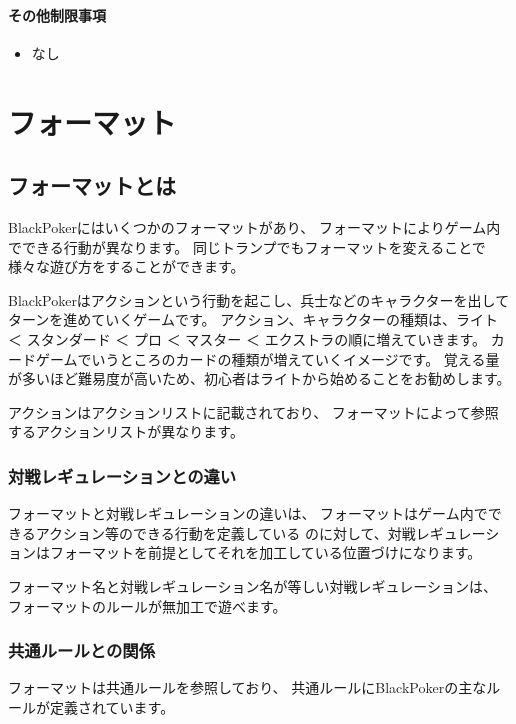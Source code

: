 \documentclass[letterpaper,10pt,dvipdfmx]{sphinxmanual}
\begin{document}
\subsubsection{その他制限事項}
\label{\detokenize{match-regulations/master40:id5}}\begin{itemize}
\item {} 
なし

\end{itemize}


\chapter{フォーマット}
\label{\detokenize{format/format:id1}}\label{\detokenize{format/format::doc}}

\section{フォーマットとは}
\label{\detokenize{format/format:id2}}
BlackPokerにはいくつかのフォーマットがあり、
フォーマットによりゲーム内でできる行動が異なります。
同じトランプでもフォーマットを変えることで様々な遊び方をすることができます。

BlackPokerはアクションという行動を起こし、兵士などのキャラクターを出してターンを進めていくゲームです。
アクション、キャラクターの種類は、ライト ＜ スタンダード ＜ プロ ＜ マスター ＜ エクストラの順に増えていきます。
カードゲームでいうところのカードの種類が増えていくイメージです。
覚える量が多いほど難易度が高いため、初心者はライトから始めることをお勧めします。

アクションはアクションリストに記載されており、
フォーマットによって参照するアクションリストが異なります。


\subsection{対戦レギュレーションとの違い}
\label{\detokenize{format/format:id3}}
フォーマットと対戦レギュレーションの違いは、
フォーマットはゲーム内でできるアクション等のできる行動を定義している
のに対して、対戦レギュレーションはフォーマットを前提としてそれを加工している位置づけになります。

フォーマット名と対戦レギュレーション名が等しい対戦レギュレーションは、
フォーマットのルールが無加工で遊べます。


\subsection{共通ルールとの関係}
\label{\detokenize{format/format:id4}}
フォーマットは共通ルールを参照しており、
共通ルールにBlackPokerの主なルールが定義されています。
\end{document}
